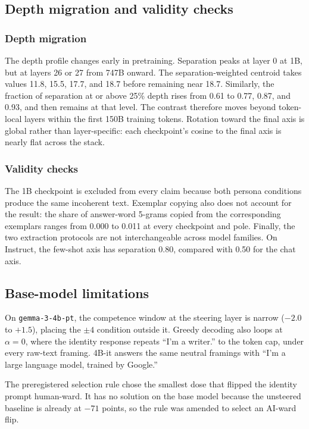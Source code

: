 \subsection{Depth migration and validity checks}

\subsubsection{Depth migration}

The depth profile changes early in pretraining. Separation peaks at layer 0 at
1B, but at layers 26 or 27 from 747B onward. The separation-weighted centroid
takes values 11.8, 15.5, 17.7, and 18.7 before remaining near 18.7. Similarly,
the fraction of separation at or above 25\% depth rises from 0.61 to 0.77,
0.87, and 0.93, and then remains at that level. The contrast therefore moves
beyond token-local layers within the first 150B training tokens. Rotation
toward the final axis is global rather than layer-specific: each checkpoint's
cosine to the final axis is nearly flat across the stack.

\subsubsection{Validity checks}

The 1B checkpoint is excluded from every claim because both persona conditions
produce the same incoherent text. Exemplar copying also does not account for
the result: the share of answer-word 5-grams copied from the corresponding
exemplars ranges from 0.000 to 0.011 at every checkpoint and pole. Finally, the
two extraction protocols are not interchangeable across model families. On
Instruct, the few-shot axis has separation 0.80, compared with 0.50 for the
chat axis.

\subsection{Base-model limitations}

On \texttt{gemma-3-4b-pt}, the competence window at the steering layer is
narrow ($-2.0$ to $+1.5$), placing the $\pm4$ condition outside it. Greedy
decoding also loops at $\alpha = 0$, where the identity response repeats
``I'm a writer.'' to the token cap, under every raw-text framing. 4B-it
answers the same neutral framings with ``I'm a large language model,
trained by Google.''

The preregistered selection rule chose the
smallest dose that flipped the identity prompt human-ward. It has no solution
on the base model because the unsteered baseline is already at $-71$ points, so
the rule was amended to select an AI-ward flip.

